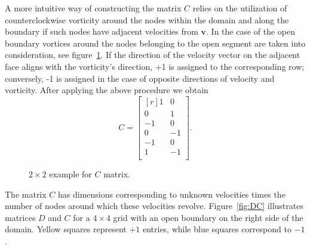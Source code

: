 \documentclass{article}
\begin{document}
A more intuitive way of constructing the matrix $C$ relies on the utilization of counterclockwise vorticity around the nodes within the domain and along the boundary if such nodes have adjacent velocities from $\boldsymbol{v}$. In the case of the open boundary vortices around the nodes belonging to the open segment are taken into consideration, see figure~\ref{fig:C-example-2x2}. If the direction of the velocity vector on the adjacent face aligns with the vorticity's direction, +1 is assigned to the corresponding row; conversely, -1 is assigned in the case of opposite directions of velocity and vorticity. After applying the above procedure we obtain
\begin{equation}
  C = 
  \begin{bmatrix*}[r]
  1		&	0\\
  0		&	1\\
  -1	&	0\\
  0		&	-1\\
  -1	&	0\\
  1		&	-1\\
\end{bmatrix*}.
\end{equation}

\begin{figure}[h] %
  \caption{$2\times 2$ example for $C$ matrix.}\label{fig:C-example-2x2}
\end{figure}


The matrix $C$ has dimensions corresponding to unknown velocities times the number of nodes around which these velocities revolve. Figure~\ref{fig:DC} illustrates matrices $D$ and $C$ for a $4\times4$ grid with an open boundary on the right side of the domain. Yellow squares represent $+1$ entries, while blue squares correspond to $-1$. 
\end{document}

